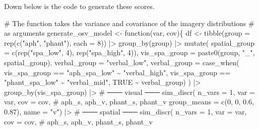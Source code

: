 \documentclass[
  authoryear]{elsarticle}
\newenvironment{Shaded}{\begin{snugshade}}{\end{snugshade}}
\newcommand{\CommentTok}[1]{\textcolor[rgb]{0.37,0.37,0.37}{#1}}
\newcommand{\DecValTok}[1]{\textcolor[rgb]{0.68,0.00,0.00}{#1}}
\newcommand{\FloatTok}[1]{\textcolor[rgb]{0.68,0.00,0.00}{#1}}
\newcommand{\NormalTok}[1]{\textcolor[rgb]{0.00,0.23,0.31}{#1}}
\newcommand{\OperatorTok}[1]{\textcolor[rgb]{0.37,0.37,0.37}{#1}}
\newcommand{\StringTok}[1]{\textcolor[rgb]{0.13,0.47,0.30}{#1}}
\begin{document}
Down below is the code to generate these scores.

\begin{Shaded}
\begin{Highlighting}[]
\CommentTok{\# The function takes the variance and covariance of the imagery distributions}
\CommentTok{\# as arguments}
\NormalTok{generate\_osv\_model }\OperatorTok{\textless{}{-}}\NormalTok{ function(var, cov)\{}
\NormalTok{  df }\OperatorTok{\textless{}{-}} 
\NormalTok{    tibble(group }\OperatorTok{=}\NormalTok{ rep(c(}\StringTok{"aph"}\NormalTok{, }\StringTok{"phant"}\NormalTok{), each }\OperatorTok{=} \DecValTok{8}\NormalTok{)) }\OperatorTok{|\textgreater{}} 
\NormalTok{    group\_by(group) }\OperatorTok{|\textgreater{}} 
\NormalTok{    mutate(}
\NormalTok{      spatial\_group }\OperatorTok{=}\NormalTok{ c(rep(}\StringTok{"spa\_low"}\NormalTok{, }\DecValTok{4}\NormalTok{), rep(}\StringTok{"spa\_high"}\NormalTok{, }\DecValTok{4}\NormalTok{)),}
\NormalTok{      vis\_spa\_group }\OperatorTok{=}\NormalTok{ paste0(group, }\StringTok{"\_"}\NormalTok{, spatial\_group),}
\NormalTok{      verbal\_group }\OperatorTok{=} \StringTok{"verbal\_low"}\NormalTok{,}
\NormalTok{      verbal\_group  }\OperatorTok{=}\NormalTok{ case\_when(}
\NormalTok{        vis\_spa\_group }\OperatorTok{==} \StringTok{"aph\_spa\_low"} \OperatorTok{\textasciitilde{}} \StringTok{"verbal\_high"}\NormalTok{, }
\NormalTok{        vis\_spa\_group }\OperatorTok{==} \StringTok{"phant\_spa\_low"} \OperatorTok{\textasciitilde{}} \StringTok{"verbal\_mid"}\NormalTok{,}
\NormalTok{        TRUE }\OperatorTok{\textasciitilde{}}\NormalTok{ verbal\_group)}
\NormalTok{    ) }\OperatorTok{|\textgreater{}} 
\NormalTok{    group\_by(vis\_spa\_group) }\OperatorTok{|\textgreater{}} 
    \CommentTok{\# ─── visual ───}
\NormalTok{    sim\_discr(}
\NormalTok{      n\_vars }\OperatorTok{=} \DecValTok{1}\NormalTok{, }
\NormalTok{      var }\OperatorTok{=}\NormalTok{ var, }
\NormalTok{      cov }\OperatorTok{=}\NormalTok{ cov, }
      \CommentTok{\# aph\_s, aph\_v, phant\_s, phant\_v}
\NormalTok{      group\_means }\OperatorTok{=}\NormalTok{ c(}\DecValTok{0}\NormalTok{, }\DecValTok{0}\NormalTok{, }\FloatTok{0.6}\NormalTok{, }\FloatTok{0.87}\NormalTok{), }
\NormalTok{      name }\OperatorTok{=} \StringTok{"v"}\NormalTok{) }\OperatorTok{|\textgreater{}} 
    \CommentTok{\# ─── spatial ───}
\NormalTok{    sim\_discr(}
\NormalTok{      n\_vars }\OperatorTok{=} \DecValTok{1}\NormalTok{,  }
\NormalTok{      var }\OperatorTok{=}\NormalTok{ var, }
\NormalTok{      cov }\OperatorTok{=}\NormalTok{ cov, }
      \CommentTok{\# aph\_s, aph\_v, phant\_s, phant\_v}

\end{Highlighting}
\end{Shaded}
\end{document}
